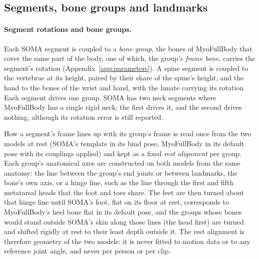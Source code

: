 \documentclass[11pt]{article}
\begin{document}
\subsection{Segments, bone groups and landmarks}

\paragraph{Segment rotations and bone groups.} Each SOMA segment is coupled to a \emph{bone group}, the bones of
MyoFullBody that cover the same part of the body, one of which, the group's \emph{frame bone}, carries the segment's
rotation (Appendix~\ref{app:parameters}). A spine segment is coupled to the vertebrae at its height, paired by their
share of the spine's height, and the hand to the bones of the wrist and hand, with the lunate carrying its rotation.
Each segment drives one group. SOMA has two neck segments where MyoFullBody has a single rigid neck; the first drives
it, and the second drives nothing, although its rotation error is still reported.

How a segment's frame lines up with its group's frame is read once from the two models at rest (SOMA's template in its
bind pose, MyoFullBody in its default pose with its couplings applied) and kept as a fixed \emph{rest alignment} per
group. Each group's anatomical axes are constructed on both models from the same anatomy: the line between the
group's end joints or between landmarks, the bone's own axis, or a hinge line, such as the line through the first and
fifth metatarsal heads that the foot and toes share. The feet are then turned about that hinge line until SOMA's foot,
flat on its floor at rest, corresponds to MyoFullBody's heel bone flat in its default pose, and the groups whose bones
would stand outside SOMA's skin along those lines (the head first) are turned and shifted rigidly at rest to their
least depth outside it. The rest alignment is therefore geometry of the two models: it is never fitted to motion data
or to any reference joint angle, and never per person or per clip.
\end{document}
